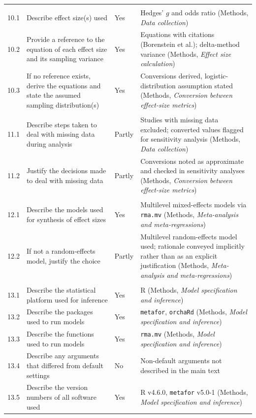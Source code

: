 \begin{longtable}{@{}p{0.9cm} p{5.5cm} p{1.4cm} p{6.0cm}@{}}
\addlinespace
\multicolumn{4}{@{}l}{\textbf{Effect size measures}}\\
10.1 & Describe effect size(s) used & Yes & Hedges' $g$ and odds ratio (Methods, \emph{Data collection}) \\
10.2 & Provide a reference to the equation of each effect size and its sampling variance & Yes & Equations with citations (Borenstein et al.); delta-method variance (Methods, \emph{Effect size calculation}) \\
10.3 & If no reference exists, derive the equations and state the assumed sampling distribution(s) & Yes & Conversions derived, logistic-distribution assumption stated (Methods, \emph{Conversion between effect-size metrics}) \\

\addlinespace
\multicolumn{4}{@{}l}{\textbf{Missing data}}\\
11.1 & Describe steps taken to deal with missing data during analysis & Partly & Studies with missing data excluded; converted values flagged for sensitivity analysis (Methods, \emph{Data collection}) \\
11.2 & Justify the decisions made to deal with missing data & Partly & Conversions noted as approximate and checked in sensitivity analyses (Methods, \emph{Conversion between effect-size metrics}) \\

\addlinespace
\multicolumn{4}{@{}l}{\textbf{Meta-analytic model description}}\\
12.1 & Describe the models used for synthesis of effect sizes & Yes & Multilevel mixed-effects models via \texttt{rma.mv} (Methods, \emph{Meta-analysis and meta-regressions}) \\
12.2 & If not a random-effects model, justify the choice & Partly & Multilevel random-effects model used; rationale conveyed implicitly rather than as an explicit justification (Methods, \emph{Meta-analysis and meta-regressions}) \\

\addlinespace
\multicolumn{4}{@{}l}{\textbf{Software}}\\
13.1 & Describe the statistical platform used for inference & Yes & R (Methods, \emph{Model specification and inference}) \\
13.2 & Describe the packages used to run models & Yes & \texttt{metafor}, \texttt{orchaRd} (Methods, \emph{Model specification and inference}) \\
13.3 & Describe the functions used to run models & Yes & \texttt{rma.mv} (Methods, \emph{Model specification and inference}) \\
13.4 & Describe any arguments that differed from default settings & No & Non-default arguments not described in the main text \\
13.5 & Describe the version numbers of all software used & Yes & R v4.6.0, \texttt{metafor} v5.0-1 (Methods, \emph{Model specification and inference}) \\


\end{longtable}
